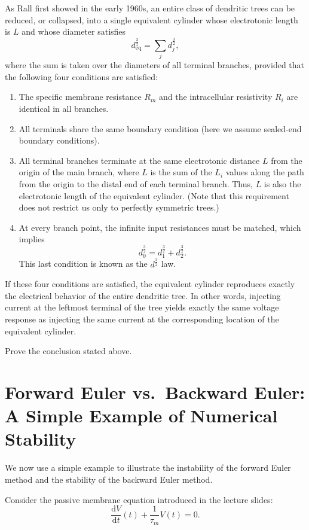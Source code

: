 \documentclass{article}
\begin{document}
As Rall first showed in the early 1960s, an entire class of dendritic trees can be reduced, or collapsed, into a single equivalent cylinder whose electrotonic length is $L$ and whose diameter satisfies
\[
d_{\mathrm{eq}}^{\frac{3}{2}}=\sum_j d_j^{\frac{3}{2}},
\]
where the sum is taken over the diameters of all terminal branches, provided that the following four conditions are satisfied:
\begin{enumerate}
    \item The specific membrane resistance $R_m$ and the intracellular resistivity $R_i$ are identical in all branches.
    \item All terminals share the same boundary condition (here we assume sealed-end boundary conditions).
    \item All terminal branches terminate at the same electrotonic distance $L$ from the origin of the main branch, where $L$ is the sum of the $L_i$ values along the path from the origin to the distal end of each terminal branch. Thus, $L$ is also the electrotonic length of the equivalent cylinder. (Note that this requirement does not restrict us only to perfectly symmetric trees.)
    \item At every branch point, the infinite input resistances must be matched, which implies
    \[
    d_0^{\frac{3}{2}} = d_1^{\frac{3}{2}} + d_2^{\frac{3}{2}}.
    \]
    This last condition is known as the $d^{\frac{3}{2}}$ law.
\end{enumerate}

If these four conditions are satisfied, the equivalent cylinder reproduces exactly the electrical behavior of the entire dendritic tree. In other words, injecting current at the leftmost terminal of the tree yields exactly the same voltage response as injecting the same current at the corresponding location of the equivalent cylinder.

Prove the conclusion stated above.

\clearpage

\section{Forward Euler vs.\ Backward Euler: A Simple Example of Numerical Stability}

We now use a simple example to illustrate the instability of the forward Euler method and the stability of the backward Euler method.

Consider the passive membrane equation introduced in the lecture slides:
\[
\frac{\mathrm{d}V}{\mathrm{d}t}(t)+\frac{1}{\tau_m}V(t)=0.
\]
\end{document}
